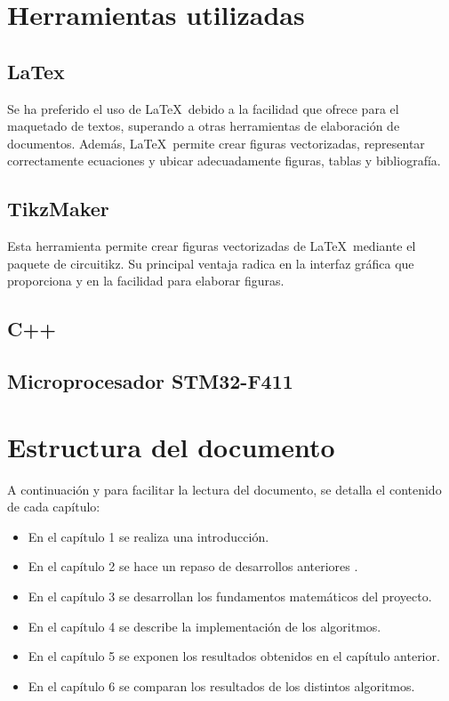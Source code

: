\section{Herramientas utilizadas}
\subsection{LaTex \cite{latex}} 
Se ha preferido el uso de \LaTeX\ debido a la facilidad que ofrece para el maquetado de textos, superando a otras herramientas de elaboración de documentos. Además, \LaTeX\ permite crear figuras vectorizadas, representar correctamente ecuaciones y ubicar adecuadamente figuras, tablas y bibliografía.
\subsection{TikzMaker \cite{tikzmaker}} 
Esta herramienta permite crear figuras vectorizadas de \LaTeX\ mediante el paquete de circuitikz. Su principal ventaja radica en la interfaz gráfica que proporciona y en la facilidad para elaborar figuras.

\subsection{C++ }

\subsection{Microprocesador STM32-F411}

\section{Estructura del documento}
A continuación y para facilitar la lectura del documento, se detalla el contenido de cada capítulo:

\begin{itemize}
	\item En el capítulo 1 se realiza una introducción.
	\item En el capítulo 2 se hace un repaso de desarrollos anteriores .
	\item En el capítulo 3 se desarrollan los fundamentos matemáticos del proyecto.
	\item En el capítulo 4 se describe la implementación de los algoritmos.
	\item En el capítulo 5 se exponen los resultados obtenidos en el capítulo anterior. 
	\item En el capítulo 6 se comparan los resultados de los distintos algoritmos.
\end{itemize}